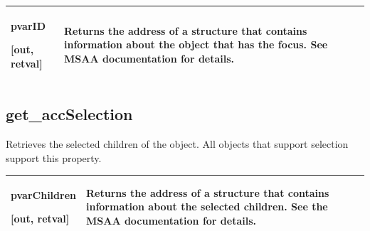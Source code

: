 \documentclass[letterpaper,12pt,english,openany,oneside]{sphinxmanual}
\begin{document}
\begin{sphinxVerbatim}[commandchars=\\\{\}]
  
\end{sphinxVerbatim}



\begin{savenotes}\sphinxattablestart
\centering
{}\label{\detokenize{MSAA_PDF:section-13}}\nobreak
\begin{tabulary}{\linewidth}[t]{|T|T|}
\hline

pvarID

{[}out, retval{]}
&
Returns the address of a  structure that contains information about the object that has the focus. See MSAA documentation for details.
\\
\hline
\end{tabulary}
\par
\sphinxattableend\end{savenotes}


\begin{sphinxVerbatim}[commandchars=\\\{\}]
\end{sphinxVerbatim}


\subsection{get\_accSelection}
\label{\detokenize{MSAA_PDF:get-accselection}}
Retrieves the selected children of the object. All objects that support selection support this property.

\begin{sphinxVerbatim}[commandchars=\\\{\}]
  
\end{sphinxVerbatim}



\begin{savenotes}\sphinxattablestart
\centering
{}\label{\detokenize{MSAA_PDF:section-14}}\nobreak
\begin{tabulary}{\linewidth}[t]{|T|T|}
\hline

pvarChildren

{[}out, retval{]}
&
Returns the address of a  structure that contains information about the selected children. See the MSAA documentation for details.
\\
\hline
\end{tabulary}
\par
\sphinxattableend\end{savenotes}
\end{document}
